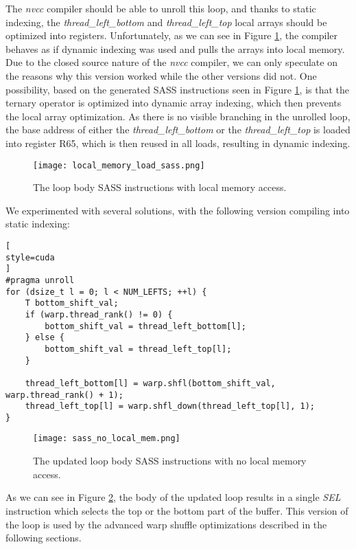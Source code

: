 The \textit{nvcc} compiler should be able to unroll this loop, and thanks to static indexing, the \textit{thread\_left\_bottom} and \textit{thread\_left\_top} local arrays should be optimized into registers. Unfortunately, as we can see in Figure \ref{fig:local_memory_load_sass}, the compiler behaves as if dynamic indexing was used and pulls the arrays into local memory. 
Due to the closed source nature of the \textit{nvcc} compiler, we can only speculate on the reasons why this version worked while the other versions did not. One possibility, based on the generated SASS instructions seen in Figure \ref{fig:local_memory_load_sass}, is that the ternary operator is optimized into dynamic array indexing, which then prevents the local array optimization. As there is no visible branching in the unrolled loop, the base address of either the \textit{thread\_left\_bottom} or the \textit{thread\_left\_top} is loaded into register R65, which is then reused in all loads, resulting in dynamic indexing. 

\begin{figure}[ht]
	\centering
	\texttt{[image: local\_memory\_load\_sass.png]}
	\caption{The loop body SASS instructions with local memory access.}
	\label{fig:local_memory_load_sass}
\end{figure}

We experimented with several solutions, with the following version compiling into static indexing:

\begin{lstlisting}[
style=cuda
]
#pragma unroll
for (dsize_t l = 0; l < NUM_LEFTS; ++l) {
	T bottom_shift_val;
	if (warp.thread_rank() != 0) {
		bottom_shift_val = thread_left_bottom[l];
	} else {
		bottom_shift_val = thread_left_top[l];
	}

	thread_left_bottom[l] = warp.shfl(bottom_shift_val, warp.thread_rank() + 1);
	thread_left_top[l] = warp.shfl_down(thread_left_top[l], 1);
}
\end{lstlisting}


\begin{figure}[ht]
	\centering
	\texttt{[image: sass\_no\_local\_mem.png]}
	\caption{The updated loop body SASS instructions with no local memory access.}
	\label{fig:sass_no_local_memory}
\end{figure}

As we can see in Figure \ref{fig:sass_no_local_memory}, the body of the updated loop results in a single \textit{SEL} instruction which selects the top or the bottom part of the buffer. This version of the loop is used by the advanced warp shuffle optimizations described in the following sections.

